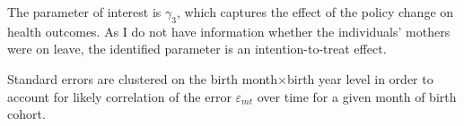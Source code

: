 \documentclass[11pt, a4paper,draft]{article} %
\begin{document}
The parameter of interest is $\gamma_3$, which captures the effect of the policy change on health outcomes. As I do not have information whether the individuals' mothers were on leave, the identified parameter is an intention-to-treat effect. \newline

Standard errors are clustered on the birth month$\times$birth year level in order to account for likely correlation of the error $\varepsilon_{mt}$ over time for a given month of birth cohort.



\bigskip
\end{document}
